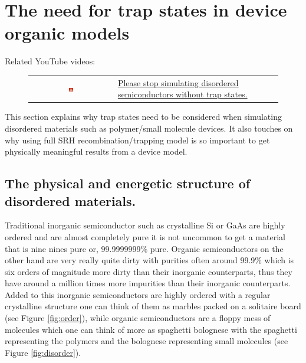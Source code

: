 \newpage
\section{The need for trap states in device organic models}
\label{sec:the_need_for_trap_states}
Related YouTube videos:
\begin{figure}[H]

\begin{tabular}{ c l }

\includegraphics[width=0.05\textwidth]{./images/youtube.png}

&
\href{https://www.youtube.com/watch?v=2EHfulz7UDU}{Please stop simulating disordered semiconductors without trap states.}

\end{tabular}
\end{figure}
This section explains why trap states need to be considered when simulating disordered materials such as polymer/small molecule devices. It also touches on why using full SRH recombination/trapping model is so important to get physically meaningful results from a device model.

\subsection{The physical and energetic structure of disordered materials.}
Traditional inorganic semiconductor such as crystalline Si or GaAs are highly ordered and are almost completely pure it is not uncommon to get a material that is nine nines pure or, 99.9999999\% pure. Organic semiconductors on the other hand are very really quite dirty with purities often around 99.9\% which is six orders of magnitude more dirty than their inorganic counterparts, thus they have around a million times more impurities than their inorganic counterparts.  Added to this inorganic semiconductors are highly ordered with a regular crystalline structure one can think of them as marbles packed on a solitaire board (see Figure \ref{fig:order}), while organic semiconductors are a floppy mess of molecules which one can think of more as spaghetti bolognese with the spaghetti representing the polymers and the bolognese representing small molecules (see Figure \ref{fig:disorder}).

